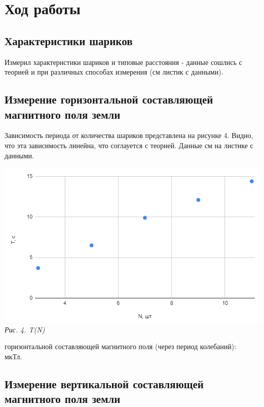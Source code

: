 

\section{Ход работы}
\subsection{Характеристики шариков}
Измерил характеристики шариков и типовые расстояния - данные сошлись с теорией и при различных способах измерения (см листик с данными).

\subsection{Измерение горизонтальной составляющей магнитного поля земли}

Зависимость периода от количества шариков представлена на рисунке 4. Видно, что эта зависимость линейна, что соглауется с теорией. Данные см на листике с данными.

\begin{center}

    \includegraphics[scale=0.9]{picks/121-graph1.png} \\
    \textit{Рис. 4. T(N)}

\end{center}

 горизонтальной составляющей магнитного поля (через период колебаний): \\
 мкТл.

\newpage

\subsection{Измерение вертикальной составляющей магнитного поля земли}

